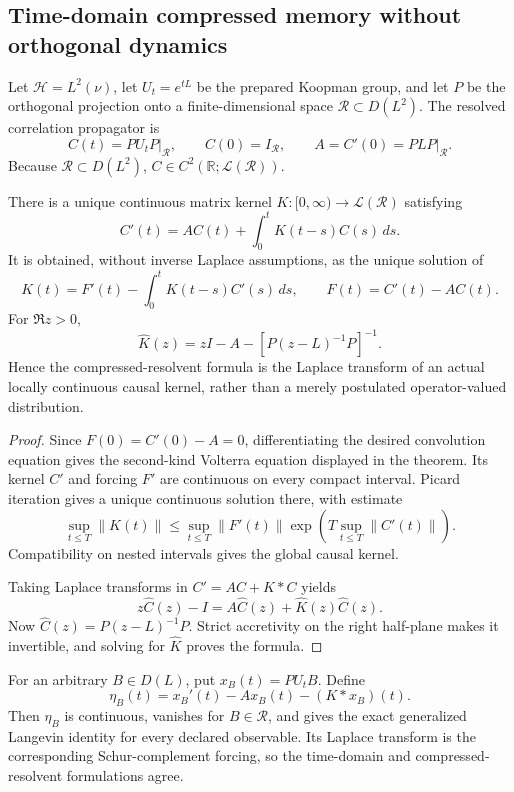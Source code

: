 \subsection{Time-domain compressed memory without orthogonal dynamics}

Let \(\mathcal H=L^2(\nu)\), let \(U_t=e^{tL}\) be the prepared Koopman
group, and let \(P\) be the orthogonal projection onto a finite-dimensional
space \(\mathcal R\subset D(L^2)\).  The resolved correlation propagator is
\[
 C(t)=PU_tP\big|_{\mathcal R},\qquad C(0)=I_{\mathcal R},
 \qquad A=C'(0)=PLP\big|_{\mathcal R}.
\]
Because \(\mathcal R\subset D(L^2)\), \(C\in C^2(\mathbb R;
\mathcal L(\mathcal R))\).

\begin{theorem}
\label{thm:r3-a4-memory}
There is a unique continuous matrix kernel
\(K:[0,\infty)\to\mathcal L(\mathcal R)\) satisfying
\[
 C'(t)=AC(t)+\int_0^tK(t-s)C(s)\,ds.
\]
It is obtained, without inverse Laplace assumptions, as the unique solution of
\[
 K(t)=F'(t)-\int_0^tK(t-s)C'(s)\,ds,
 \qquad F(t)=C'(t)-AC(t).
\]
For \(\Re z>0\),
\[
 \widehat K(z)
 =zI-A-[P(z-L)^{-1}P]^{-1}.
\]
Hence the compressed-resolvent formula is the Laplace transform of an actual
locally continuous causal kernel, rather than a merely postulated
operator-valued distribution.
\end{theorem}

\begin{proof}
Since \(F(0)=C'(0)-A=0\), differentiating the desired convolution equation
gives the second-kind Volterra equation displayed in the theorem.  Its kernel
\(C'\) and forcing \(F'\) are continuous on every compact interval.  Picard
iteration gives a unique continuous solution there, with estimate
\[
 \sup_{t\le T}\|K(t)\|
 \le \sup_{t\le T}\|F'(t)\|
 \exp\left(T\sup_{t\le T}\|C'(t)\|\right).
\]
Compatibility on nested intervals gives the global causal kernel.

Taking Laplace transforms in
\(C'=AC+K*C\) yields
\[
 z\widehat C(z)-I=A\widehat C(z)+
 \widehat K(z)\widehat C(z).
\]
Now \(\widehat C(z)=P(z-L)^{-1}P\).  Strict accretivity on the right
half-plane makes it invertible, and solving for \(\widehat K\) proves the
formula.
\end{proof}

For an arbitrary \(B\in D(L)\), put \(x_B(t)=PU_tB\).  Define
\[
 \eta_B(t)=x_B'(t)-Ax_B(t)-(K*x_B)(t).
\]
Then \(\eta_B\) is continuous, vanishes for \(B\in\mathcal R\), and gives the
exact generalized Langevin identity for every declared observable.  Its
Laplace transform is the corresponding Schur-complement forcing, so the
time-domain and compressed-resolvent formulations agree.

